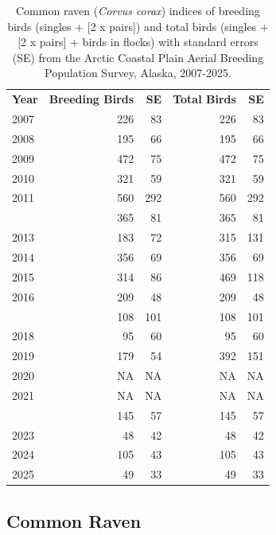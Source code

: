 \documentclass[
]{article}
\begin{document}
\begin{longtable}[t]{lrrrr}

\caption{\label{tbl-CORA}Common raven (\emph{Corvus corax}) indices of
breeding birds (singles + {[}2 x pairs{]}) and total birds (singles +
{[}2 x pairs{]} + birds in flocks) with standard errors (SE) from the
Arctic Coastal Plain Aerial Breeding Population Survey, Alaska,
2007-2025.}

\tabularnewline

\\
\toprule
\textbf{Year} & \textbf{Breeding Birds} & \textbf{SE} & \textbf{Total Birds} & \textbf{SE}\\
\midrule
2007 & 226 & 83 & 226 & 83\\
2008 & 195 & 66 & 195 & 66\\
2009 & 472 & 75 & 472 & 75\\
2010 & 321 & 59 & 321 & 59\\
2011 & 560 & 292 & 560 & 292\\
\addlinespace
2012 & 365 & 81 & 365 & 81\\
2013 & 183 & 72 & 315 & 131\\
2014 & 356 & 69 & 356 & 69\\
2015 & 314 & 86 & 469 & 118\\
2016 & 209 & 48 & 209 & 48\\
\addlinespace
2017 & 108 & 101 & 108 & 101\\
2018 & 95 & 60 & 95 & 60\\
2019 & 179 & 54 & 392 & 151\\
2020 & NA & NA & NA & NA\\
2021 & NA & NA & NA & NA\\
\addlinespace
2022 & 145 & 57 & 145 & 57\\
2023 & 48 & 42 & 48 & 42\\
2024 & 105 & 43 & 105 & 43\\
2025 & 49 & 33 & 49 & 33\\
\bottomrule

\end{longtable}

\endgroup{}

\newpage{}

\subsection*{Common Raven}\label{common-raven-2}
\end{document}
